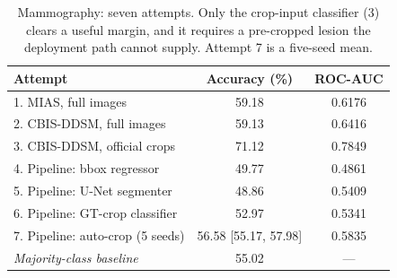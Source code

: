 \begin{table}[t]
\centering
\caption{Mammography: seven attempts. Only the crop-input classifier (3) clears a useful margin, and it requires a pre-cropped lesion the deployment path cannot supply. Attempt 7 is a five-seed mean.}
\label{tab:mammography}
\begin{tabular}{lcc}
\toprule
Attempt & Accuracy (\%) & ROC-AUC \\
\midrule
1. MIAS, full images & 59.18 & 0.6176 \\
2. CBIS-DDSM, full images & 59.13 & 0.6416 \\
3. CBIS-DDSM, official crops & 71.12 & 0.7849 \\
4. Pipeline: bbox regressor & 49.77 & 0.4861 \\
5. Pipeline: U-Net segmenter & 48.86 & 0.5409 \\
6. Pipeline: GT-crop classifier & 52.97 & 0.5341 \\
7. Pipeline: auto-crop (5 seeds) & 56.58 \tiny{[55.17, 57.98]} & 0.5835 \\
\midrule
\textit{Majority-class baseline} & 55.02 & --- \\
\bottomrule
\end{tabular}
\end{table}
